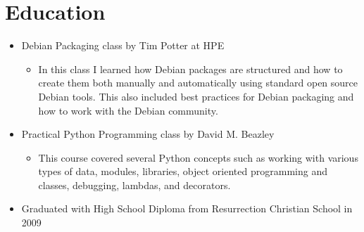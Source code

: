 \documentclass[letterpaper,10pt]{article}
\begin{document}

    \section*{Education}
        \begin{itemize}
            \item Debian Packaging class by Tim Potter at HPE
            \begin{itemize}
                \item In this class I learned how Debian packages are structured and how to create them both manually and automatically using standard open source Debian tools. This also included best practices for Debian packaging and how to work with the Debian community.
            \end{itemize}
            \item Practical Python Programming class by David M. Beazley
            \begin{itemize}
                \item This course covered several Python concepts such as working with various types of data, modules, libraries, object oriented programming and classes, debugging, lambdas, and decorators.
            \end{itemize}
            \item Graduated with High School Diploma from Resurrection Christian School in 2009
        \end{itemize}
\end{document}
